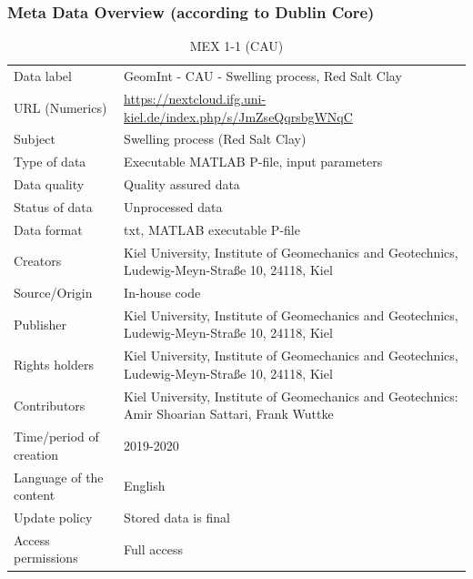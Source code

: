 \clearpage
\subsubsection*{Meta Data Overview (according to Dublin Core)}

\begin{table}[!ht]
\caption{MEX 1-1 (CAU)}
\label{tab:dms-mex1-1b}
\small
\begin{tabular}{R{3.5cm}|L{7.5cm}}
\hline
%
Data label     & GeomInt - CAU - Swelling process, Red Salt Clay\\
URL (Numerics) &  \url{https://nextcloud.ifg.uni-kiel.de/index.php/s/JmZseQqrsbgWNqC} \\
Subject        &  Swelling process (Red Salt Clay)\\
Type of data   & Executable MATLAB P-file, input parameters\\
Data quality   &  Quality assured data \\
Status of data &  Unprocessed data\\
Data format    & txt, MATLAB executable P-file\\
Creators       &  Kiel University, Institute of Geomechanics and Geotechnics, Ludewig-Meyn-Stra\ss e 10, 24118, Kiel\\
Source/Origin  & In-house code \\
Publisher      & Kiel University, Institute of Geomechanics and Geotechnics, Ludewig-Meyn-Stra\ss e 10, 24118, Kiel \\
Rights holders & Kiel University, Institute of Geomechanics and Geotechnics, Ludewig-Meyn-Stra\ss e 10, 24118, Kiel \\
Contributors   & Kiel University, Institute of Geomechanics and Geotechnics: Amir Shoarian Sattari, Frank Wuttke\\
Time/period of creation & 2019-2020\\
Language of the content & English\\
Update policy           & Stored data is final\\
Access permissions      & Full access\\
%
\hline
\end{tabular}
\end{table}